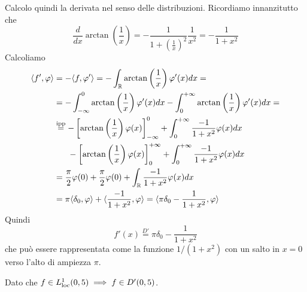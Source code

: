 Calcolo quindi la derivata nel senso delle distribuzioni. Ricordiamo innanzitutto che
\begin{equation*}
\frac{d}{dx}\arctan\left(\frac{1}{x}\right) = - \frac{1}{1 + \left(\frac{1}{x}\right)^{2}}\frac{1}{x^{2}} = - \frac{1}{1 + x^{2}}
\end{equation*}
Calcoliamo
\begin{align*}
\langle f', \varphi \rangle & = - \langle f, \varphi '\rangle = - \int_{\mathbb{R}}\arctan\left(\frac{1}{x}\right) \varphi '(x)dx = \\
 & = - \int^{0}_{- \infty}\arctan\left(\frac{1}{x}\right) \varphi '(x)dx - \int^{+ \infty}_{0}\arctan\left(\frac{1}{x}\right) \varphi '(x)dx = \\
 & \overset{\text{ipp}}{=} - \left[\arctan\left(\frac{1}{x}\right) \varphi (x)\right]^{0}_{- \infty} + \int^{+ \infty}_{0}\frac{- 1}{1 + x^{2}} \varphi (x) dx\\
 & \ \ \ \ \ - \left[\arctan\left(\frac{1}{x}\right) \varphi (x)\right]^{+ \infty}_{0} + \int^{+ \infty}_{0}\frac{- 1}{1 + x^{2}} \varphi (x) dx\\
 & = \frac{\pi}{2} \varphi (0) + \frac{\pi}{2} \varphi (0) + \int_{\mathbb{R}}\frac{- 1}{1 + x^{2}} \varphi (x)dx\\
 & = \pi \langle \delta_{0}, \varphi \rangle + \langle \frac{- 1}{1 + x^{2}}, \varphi \rangle = \langle \pi \delta_{0} - \frac{1}{1 + x^{2}}, \varphi \rangle
\end{align*}
Quindi
\begin{equation*}
f'(x)\overset{D'}{=} \pi \delta_{0} - \frac{1}{1 + x^{2}}
\end{equation*}
che può essere rappresentata come la funzione $1/\left(1 + x^{2}\right)$ con un salto in $x = 0$ verso l'alto di ampiezza $\pi $.
\Soluzione

Dato che $f\in L^{1}_{\operatorname{loc}} (0, 5)\implies f\in D'(0, 5)$.


